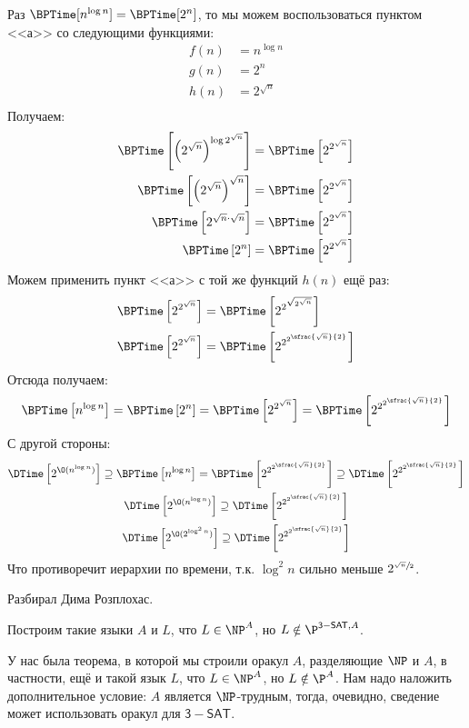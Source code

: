 	Раз $\BPTime[n^{\log n}] = \BPTime[2^n]$, то мы можем воспользоваться пунктом <<а>> со следующими функциями:
	\begin{align*}
		f(n) &= n^{\log n} \\
		g(n) &= 2^n \\
		h(n) &= 2^{\sqrt n} \\
	\end{align*}
	Получаем:
	\begin{align*}
		\BPTime\left[\left(2^{\sqrt n}\right)^{\log 2^{\sqrt n}}\right] &= \BPTime\left[2^{2^{\sqrt n}}\right] \\
		\BPTime\left[\left(2^{\sqrt n}\right)^{\sqrt n}\right] &= \BPTime\left[2^{2^{\sqrt n}}\right] \\
		\BPTime\left[2^{\sqrt n \cdot \sqrt n}\right] &= \BPTime\left[2^{2^{\sqrt n}}\right] \\
		\BPTime\left[2^n\right] &= \BPTime\left[2^{2^{\sqrt n}}\right]
	\end{align*}
	Можем применить пункт <<а>> с той же функций $h(n)$ ещё раз:
	\begin{align*}
		\BPTime\left[2^{2^{\sqrt n}}\right] &= \BPTime\left[2^{2^{\sqrt{2^{\sqrt n}}}}\right] \\
		\BPTime\left[2^{2^{\sqrt n}}\right] &= \BPTime\left[2^{2^{2^{\sfrac{\sqrt n}{2}}}}\right]
	\end{align*}
	Отсюда получаем:
	\[
		\BPTime\left[n^{\log n}\right] = \BPTime\left[2^n\right] = \BPTime\left[2^{2^{\sqrt n}}\right] = \BPTime\left[2^{2^{2^{\sfrac{\sqrt n}{2}}}}\right]
	\]
	С другой стороны:
	\begin{gather*}
		\DTime\left[2^{\O(n^{\log n})}\right] \supseteq \BPTime\left[n^{\log n}\right] =
		\BPTime\left[2^{2^{2^{\sfrac{\sqrt n}{2}}}}\right] \supseteq \DTime\left[2^{2^{2^{\sfrac{\sqrt n}{2}}}}\right] \\
		\DTime\left[2^{\O(n^{\log n})}\right] \supseteq \DTime\left[2^{2^{2^{\sfrac{\sqrt n}{2}}}}\right] \\
		\DTime\left[2^{\O(2^{\log^2 n})}\right] \supseteq \DTime\left[2^{2^{2^{\sfrac{\sqrt n}{2}}}}\right] \\
	\end{gather*}
	Что противоречит иерархии по времени, т.к. $\log^2 n$ сильно меньше $2^{\sfrac{\sqrt n}{2}}$.

	Разбирал Дима Розплохас.

	Построим такие языки $A$ и $L$, что $L \in \NP^A$, но $L \notin \P^{\mathsf{3-SAT}, A}$.
	
	У нас была теорема, в которой мы строили оракул $A$, разделяющие $\NP$ и $A$, в частности,
	ещё и такой язык $L$, что $L \in \NP^A$, но $L \notin \P^A$.
	Нам надо наложить дополнительное условие: $A$ является $\NP$-трудным, тогда, очевидно,
	сведение может использовать оракул для $\mathsf{3-SAT}$.

